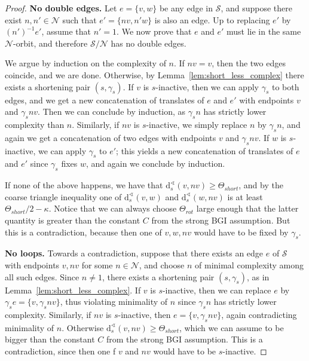 \documentclass[svgnames]{amsart}
\theoremstyle{plain}
\theoremstyle{definition}
\newcommand{\dist}{\mathrm{d}}
\newcommand{\N}{\mathcal{N}}
\newcommand{\calS}{\mathcal{S}}
\renewcommand{\angle}{\sphericalangle}
\begin{document}
\begin{proof}
    \textbf{No double edges.} Let $e=\{v,w\}$ be any edge in $\calS$, and suppose there exist $n,n'\in \N$ such that $e'=\{nv,n'w\}$ is also an edge. Up to replacing $e'$ by $(n')^{-1}e'$, assume that $n'=1$. We now prove that $e$ and $e'$ must lie in the same $\N$-orbit, and therefore $\calS/\N$ has no double edges.
    
    We argue by induction on the complexity of $n$. If $nv=v$, then the two edges coincide, and we are done. Otherwise, by Lemma~\ref{lem:short_less_complex} there exists a shortening pair $(s,\gamma_s)$. If $v$ is $s$-inactive, then we can apply $\gamma_s$ to both edges, and we get a new concatenation of translates of $e$ and $e'$ with endpoints $v$ and $\gamma_s n v$. Then we can conclude by induction, as $\gamma_s n$ has strictly lower complexity than $n$. Similarly, if $nv$ is $s$-inactive, we simply replace $n$ by $\gamma_s n$, and again we get a concatenation of two edges with endpoints $v$ and $\gamma_s n v$. If $w$ is $s$-inactive, we can apply $\gamma_s$ to $e'$; this yields a new concatenation of translates of $e$ and $e'$ since $\gamma_s$ fixes $w$, and again we conclude by induction. 

If none of the above happens, we have that $\dist^\angle_s(v, nv)\ge \Theta_{short}$, and by the coarse triangle inequality one of $\dist^\angle_s(v, w)$ and $\dist^\angle_s(w, nv)$ is at least $\Theta_{short}/2-\kappa$. Notice that we can always choose $\Theta_{rot}$ large enough that the latter quantity is greater than the constant $C$ from the strong BGI assumption. But this is a contradiction, because then one of $v,w,nv$ would have to be fixed by $\gamma_s$.

\textbf{No loops.} Towards a contradiction, suppose that there exists an edge $e$ of $\calS$ with endpoints $v,nv$ for some $n\in \N$, and choose $n$ of minimal complexity among all such edges. Since $n\neq 1$, there exists a shortening pair $(s,\gamma_s)$, as in Lemma~\ref{lem:short_less_complex}. If $v$ is $s$-inactive, then we can replace $e$ by $\gamma_s e=\{v,\gamma_s nv\}$, thus violating minimality of $n$ since $\gamma_s n$ has strictly lower complexity. Similarly, if $nv$ is $s$-inactive, then $e=\{v,\gamma_snv\}$, again contradicting minimality of $n$. Otherwise $\dist^\angle_s(v, nv)\ge \Theta_{short}$, which we can assume to be bigger than the constant $C$ from the strong BGI assumption. This is a contradiction, since then one f $v$ and $nv$ would have to be $s$-inactive.
\end{proof}
\end{document}
